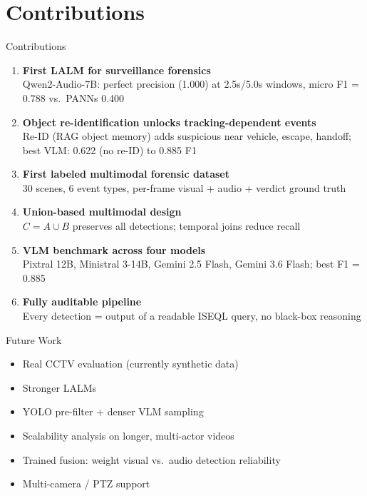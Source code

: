 \documentclass[aspectratio=169,10pt]{beamer}
\begin{document}
\section{Contributions}
\begin{frame}{Contributions}
\begin{enumerate}
  \item \textbf{First LALM for surveillance forensics}\\
  Qwen2-Audio-7B: perfect precision (1.000) at 2.5s/5.0s windows, micro F1 = 0.788 vs.\ PANNs 0.400
  \vspace{0.3em}

  \item \textbf{Object re-identification unlocks tracking-dependent events}\\
  Re-ID (RAG object memory) adds suspicious near vehicle, escape, handoff; best VLM: 0.622 (no re-ID) to 0.885 F1
  \vspace{0.3em}

  \item \textbf{First labeled multimodal forensic dataset}\\
  30 scenes, 6 event types, per-frame visual + audio + verdict ground truth
  \vspace{0.3em}

  \item \textbf{Union-based multimodal design}\\
  $C = A \cup B$ preserves all detections; temporal joins reduce recall
  \vspace{0.3em}

  \item \textbf{VLM benchmark across four models}\\
  Pixtral 12B, Ministral 3-14B, Gemini 2.5 Flash, Gemini 3.6 Flash; best F1 = 0.885
  \vspace{0.3em}

  \item \textbf{Fully auditable pipeline}\\
  Every detection = output of a readable ISEQL query, no black-box reasoning
\end{enumerate}
\end{frame}

\begin{frame}{Future Work}
\begin{itemize}
  \item Real CCTV evaluation (currently synthetic data)
  \item Stronger LALMs
  \item YOLO pre-filter + denser VLM sampling
  \item Scalability analysis on longer, multi-actor videos
  \item Trained fusion: weight visual vs.\ audio detection reliability
  \item Multi-camera / PTZ support
\end{itemize}
\end{frame}
\end{document}
